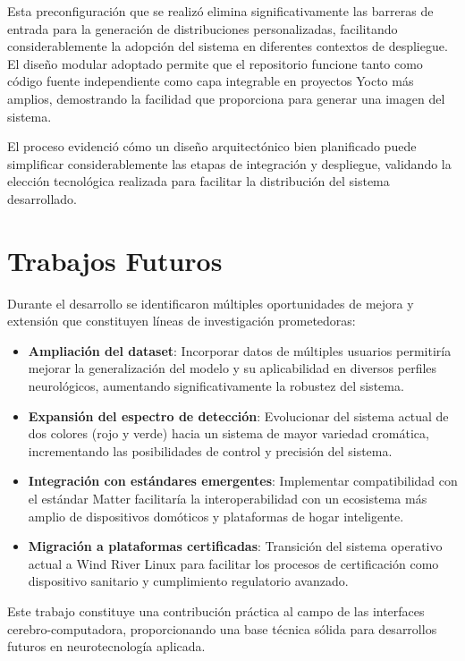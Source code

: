 Esta preconfiguración que se realizó elimina significativamente las barreras de entrada para la generación de distribuciones personalizadas, facilitando considerablemente la adopción del sistema en diferentes contextos de despliegue. El diseño modular adoptado permite que el repositorio funcione tanto como código fuente independiente como capa integrable en proyectos Yocto más amplios, demostrando la facilidad que proporciona para generar una imagen del sistema.

El proceso evidenció cómo un diseño arquitectónico bien planificado puede simplificar considerablemente las etapas de integración y despliegue, validando la elección tecnológica realizada para facilitar la distribución del sistema desarrollado.

\section*{Trabajos Futuros}

Durante el desarrollo se identificaron múltiples oportunidades de mejora y extensión que constituyen líneas de investigación prometedoras:

\begin{itemize}
    \item \textbf{Ampliación del dataset}: Incorporar datos de múltiples usuarios permitiría mejorar la generalización del modelo y su aplicabilidad en diversos perfiles neurológicos, aumentando significativamente la robustez del sistema.
    
    \item \textbf{Expansión del espectro de detección}: Evolucionar del sistema actual de dos colores (rojo y verde) hacia un sistema de mayor variedad cromática, incrementando las posibilidades de control y precisión del sistema.
    
    \item \textbf{Integración con estándares emergentes}: Implementar compatibilidad con el estándar Matter facilitaría la interoperabilidad con un ecosistema más amplio de dispositivos domóticos y plataformas de hogar inteligente.
    
    \item \textbf{Migración a plataformas certificadas}: Transición del sistema operativo actual a Wind River Linux para facilitar los procesos de certificación como dispositivo sanitario y cumplimiento regulatorio avanzado.
\end{itemize}

Este trabajo constituye una contribución práctica al campo de las interfaces cerebro-computadora, proporcionando una base técnica sólida para desarrollos futuros en neurotecnología aplicada.
